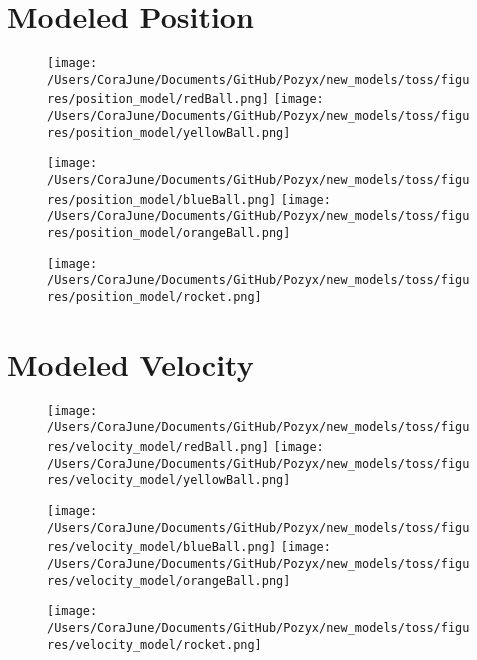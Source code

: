 \documentclass{article}
\begin{document}
\section{Modeled Position}
\begin{figure}[h!]
\begin{multicols}{2}
    \texttt{[image: /Users/CoraJune/Documents/GitHub/Pozyx/new\_models/toss/figures/position\_model/redBall.png]}
    \texttt{[image: /Users/CoraJune/Documents/GitHub/Pozyx/new\_models/toss/figures/position\_model/yellowBall.png]}
\end{multicols}

\begin{multicols}{2}
    \texttt{[image: /Users/CoraJune/Documents/GitHub/Pozyx/new\_models/toss/figures/position\_model/blueBall.png]}
    \texttt{[image: /Users/CoraJune/Documents/GitHub/Pozyx/new\_models/toss/figures/position\_model/orangeBall.png]}
\end{multicols}

    \texttt{[image: /Users/CoraJune/Documents/GitHub/Pozyx/new\_models/toss/figures/position\_model/rocket.png]}

\end{figure}
\newpage
\section{Modeled Velocity}
\begin{figure}[h!]
\begin{multicols}{2}
    \texttt{[image: /Users/CoraJune/Documents/GitHub/Pozyx/new\_models/toss/figures/velocity\_model/redBall.png]}
    \texttt{[image: /Users/CoraJune/Documents/GitHub/Pozyx/new\_models/toss/figures/velocity\_model/yellowBall.png]}
\end{multicols}

\begin{multicols}{2}
    \texttt{[image: /Users/CoraJune/Documents/GitHub/Pozyx/new\_models/toss/figures/velocity\_model/blueBall.png]}
    \texttt{[image: /Users/CoraJune/Documents/GitHub/Pozyx/new\_models/toss/figures/velocity\_model/orangeBall.png]}
\end{multicols}

    \texttt{[image: /Users/CoraJune/Documents/GitHub/Pozyx/new\_models/toss/figures/velocity\_model/rocket.png]} 
\end{figure}
\newpage
\end{document}
